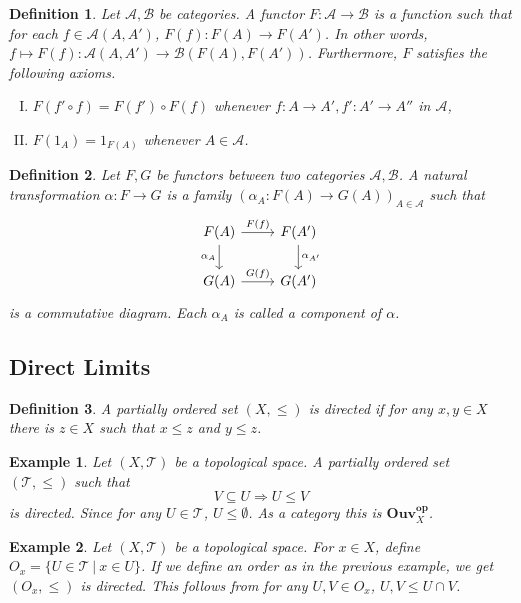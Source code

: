 \documentclass{article}
\newtheorem{definition}{Definition}[section]
\newtheorem{example}{Example}[section]
\numberwithin{equation}{section}
\begin{document}
\begin{definition}
Let $\mathcal{A},\mathcal{B}$ be categories. A functor $F:\mathcal{A}\to\mathcal{B}$ is a function such that for each $f\in\mathcal{A}(A,A')$, $F(f):F(A)\to F(A')$. In other words, $f\mapsto F(f):\mathcal{A}(A,A')\to\mathcal{B}(F(A),F(A'))$. Furthermore, $F$ satisfies the following axioms.
\begin{enumerate}[I).]
\item $F(f'\circ f) = F(f')\circ F(f)$ whenever $f:A\to A',f':A'\to A''$ in $\mathcal{A}$,
\item $F(1_A) = 1_{F(A)}$ whenever $A\in\mathcal{A}$. 
\end{enumerate}
\end{definition}

\begin{definition}
Let $F,G$ be functors between two categories $\mathcal{A},\mathcal{B}$. A natural transformation $\alpha:F\to G$ is a family $(\alpha_A:F(A)\to G(A))_{A\in\mathcal{A}}$ such that 
\[ \begin{tikzcd}
F(A) \arrow{r}{F(f)} \arrow[swap]{d}{\alpha_A} & F(A') \arrow{d}{\alpha_{A'}} \\%
G(A) \arrow{r}{G(f)}& G(A')
\end{tikzcd}
\]
is a commutative diagram. Each $\alpha_A$ is called a component of $\alpha$. 
 \label{natural_transformation}
\end{definition}

\subsection{Direct Limits}

\begin{definition}
A partially ordered set $(X,\leq)$ is directed if for any $x,y\in X$ there is $z\in X$ such that $x\leq z$ and $y\leq z$.
\end{definition}

\begin{example}
Let $(X,\mathcal{T})$ be a topological space. A partially ordered set $(\mathcal{T},\leq)$ such that 
\begin{equation*}
V\subseteq U\Rightarrow U\leq V
\end{equation*}
is directed. Since for any $U\in\mathcal{T}$, $U\leq \emptyset$. As a category this is $\mathbf{Ouv}_X^{\mathbf{op}}$.
\end{example}

\begin{example}
\label{top_dir_cat}
Let $(X,\mathcal{T})$ be a topological space. For $x\in X$, define $O_x = \{U\in\mathcal{T}\:|\: x\in U\}$. If we define an order as in the previous example, we get $(O_x,\leq)$ is directed. This follows from for any $U,V\in O_x$, $U,V\leq U\cap V$.  
\end{example}
\end{document}
